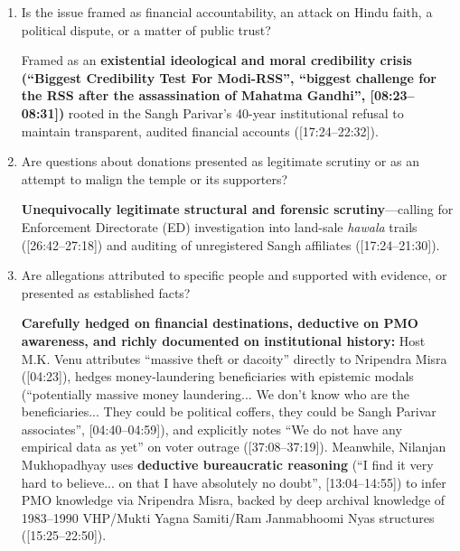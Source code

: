 \documentclass[10pt,a4paper]{article}
\begin{document}
\begin{enumerate}[leftmargin=1.5em, itemsep=6pt, topsep=4pt]
  \textbf{People Making Allegations:} Highlights \textbf{internal Hindu/movement critics}---specifically dissenting orders like Nirmohi Akhada ([ASR: Nirmala Akada], [29:11--29:38]) calling Sangh Parivar trustees ``all thieves'' after being excluded from the Trust, alongside historical references to honest 1990 Income Tax Deputy Commissioner Vishwa Bandhu Gupta ([ASR: Vishva Hindu Gupta], [15:33--17:15]) and Karnataka minister Priyank Kharge ([18:59--19:09]).
  \item Is the issue framed as financial accountability, an attack on Hindu faith, a political dispute, or a matter of public trust?\par\smallskip
  Framed as an \textbf{existential ideological and moral credibility crisis (``Biggest Credibility Test For Modi-RSS'', ``biggest challenge for the RSS after the assassination of Mahatma Gandhi'', [08:23--08:31])} rooted in the Sangh Parivar's 40-year institutional refusal to maintain transparent, audited financial accounts ([17:24--22:32]).
  \item Are questions about donations presented as legitimate scrutiny or as an attempt to malign the temple or its supporters?\par\smallskip
  \textbf{Unequivocally legitimate structural and forensic scrutiny}---calling for Enforcement Directorate (ED) investigation into land-sale \emph{hawala} trails ([26:42--27:18]) and auditing of unregistered Sangh affiliates ([17:24--21:30]).
  \item Are allegations attributed to specific people and supported with evidence, or presented as established facts?\par\smallskip
  \textbf{Carefully hedged on financial destinations, deductive on PMO awareness, and richly documented on institutional history:} Host M.K. Venu attributes ``massive theft or dacoity'' directly to Nripendra Misra ([04:23]), hedges money-laundering beneficiaries with epistemic modals (``potentially massive money laundering... We don't know who are the beneficiaries... They could be political coffers, they could be Sangh Parivar associates'', [04:40--04:59]), and explicitly notes ``We do not have any empirical data as yet'' on voter outrage ([37:08--37:19]). Meanwhile, Nilanjan Mukhopadhyay uses \textbf{deductive bureaucratic reasoning} (``I find it very hard to believe... on that I have absolutely no doubt'', [13:04--14:55]) to infer PMO knowledge via Nripendra Misra, backed by deep archival knowledge of 1983--1990 VHP/Mukti Yagna Samiti/Ram Janmabhoomi Nyas structures ([15:25--22:50]).

\end{enumerate}
\end{document}
